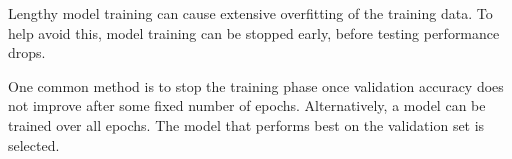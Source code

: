 Lengthy model training can cause extensive overfitting of the training data. To help avoid this, model training can be stopped early, before testing performance drops.

One common method is to stop the training phase once validation accuracy does not improve after some fixed number of epochs. Alternatively, a model can be trained over all epochs. The model that performs best on the validation set is selected.








%